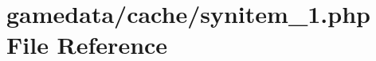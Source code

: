 \hypertarget{cache_2synitem__1_8php}{\section{gamedata/cache/synitem\+\_\+1.php File Reference}
\label{cache_2synitem__1_8php}
}
